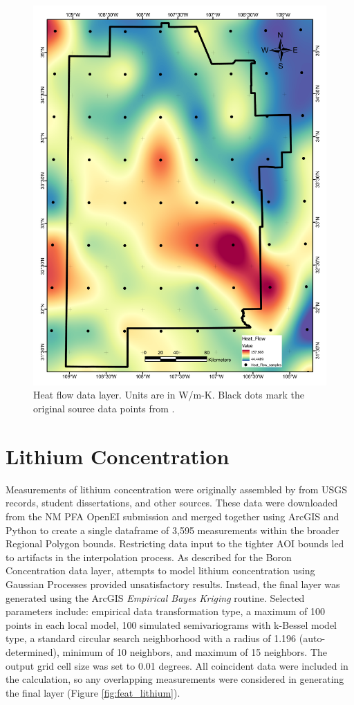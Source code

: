 \begin{figure}[H]
\centering
\includegraphics[width=0.75\linewidth]{templates/images/Figure-HeatFlow.pdf}
\caption[Heat flow data layer]{Heat flow data layer. Units are in W/m-K. Black dots mark the original source data points from \protect\citet{lucazeau_analysis_2019}.}
\label{fig:feat_heatflow}
\end{figure}
\pagebreak

\section{Lithium Concentration}\label{app:dl_lithium}
Measurements of lithium concentration were originally assembled by \citet{bielicki_hydrogeolgic_2015} from USGS records, student dissertations, and other sources. These data were downloaded from the NM PFA OpenEI submission \citep{kelley_geothermal_2015} and merged together using ArcGIS and Python to create a single dataframe of 3,595 measurements within the broader Regional Polygon bounds. Restricting data input to the tighter AOI bounds led to artifacts in the interpolation process. As described for the Boron Concentration data layer, attempts to model lithium concentration using Gaussian Processes provided unsatisfactory results. Instead, the final layer was generated using the ArcGIS \textit{Empirical Bayes Kriging} routine. Selected parameters include: empirical data transformation type, a maximum of 100 points in each local model, 100 simulated semivariograms with k-Bessel model type, a standard circular search neighborhood with a radius of 1.196 (auto-determined), minimum of 10 neighbors, and maximum of 15 neighbors. The output grid cell size was set to 0.01 degrees. All coincident data were included in the calculation, so any overlapping measurements were considered in generating the final layer (Figure \ref{fig:feat_lithium}).
\vfill
\pagebreak

